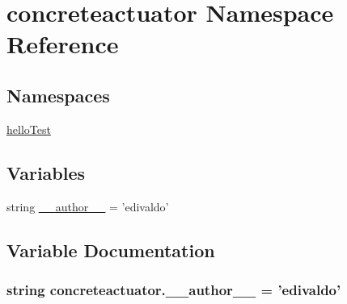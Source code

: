 \hypertarget{namespaceconcreteactuator}{}\section{concreteactuator Namespace Reference}
\label{namespaceconcreteactuator}
\subsection*{Namespaces}
\begin{DoxyCompactItemize}
\item 
 \hyperlink{namespaceconcreteactuator_1_1helloTest}{hello\+Test}
\end{DoxyCompactItemize}
\subsection*{Variables}
\begin{DoxyCompactItemize}
\item 
string \hyperlink{namespaceconcreteactuator_a28807ff8191a5ae5932b467167ed8ffc}{\+\_\+\+\_\+author\+\_\+\+\_\+} = 'edivaldo'
\end{DoxyCompactItemize}


\subsection{Variable Documentation}
\hypertarget{namespaceconcreteactuator_a28807ff8191a5ae5932b467167ed8ffc}{}
\subsubsection[{\+\_\+\+\_\+author\+\_\+\+\_\+}]{\setlength{\rightskip}{0pt plus 5cm}string concreteactuator.\+\_\+\+\_\+author\+\_\+\+\_\+ = 'edivaldo'}\label{namespaceconcreteactuator_a28807ff8191a5ae5932b467167ed8ffc}
